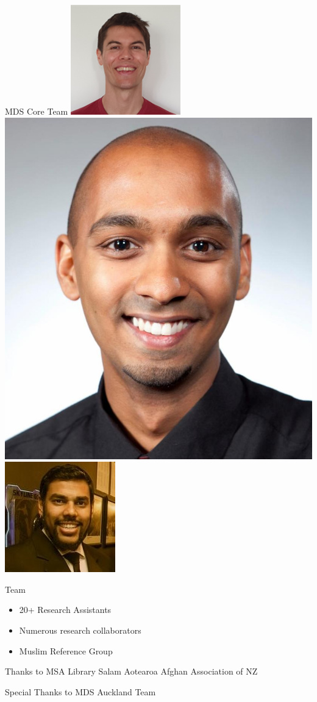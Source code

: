\documentclass[
  ignorenonframetext,
  aspectratio=169,
]{beamer}
\providecommand{\tightlist}{%
  \setlength{\itemsep}{0pt}\setlength{\parskip}{0pt}}\usepackage{longtable,booktabs,array}
\begin{document}
\begin{frame}{MDS Core Team}
\includegraphics{chris-s.png} \includegraphics{kumar-y.jpg}
\includegraphics{aarif-r.jpeg}
\end{frame}

\begin{frame}{Team}
\label{team}
\begin{itemize}
\tightlist
\item
  20+ Research Assistants
\item
  Numerous research collaborators
\item
  Muslim Reference Group
\end{itemize}
\end{frame}

\begin{frame}{Thanks to}
\label{thanks-to}
MSA Library Salam Aotearoa Afghan Association of NZ
\end{frame}

\begin{frame}{Special Thanks to MDS Auckland Team}
\label{special-thanks-to-mds-auckland-team}
\end{frame}
\end{document}
